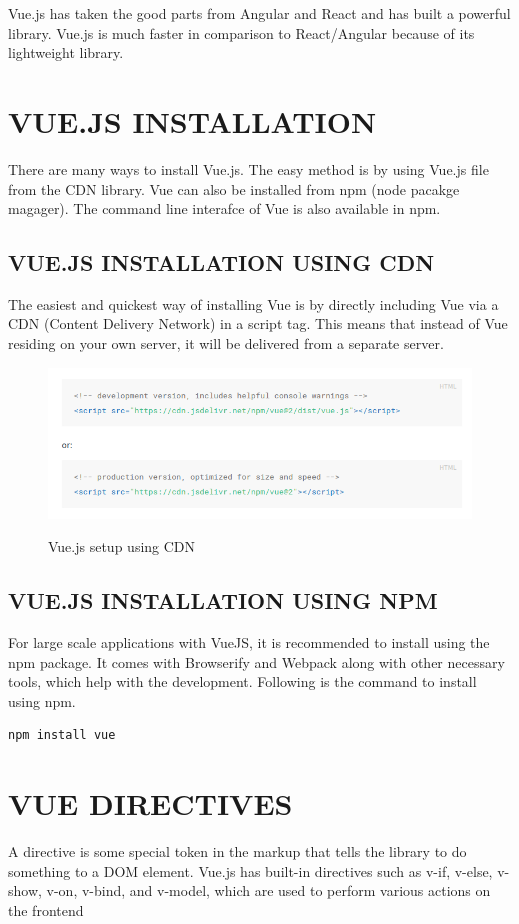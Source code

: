 \documentclass[12pt,a4paper,oneside]{report}
\begin{document}
Vue.js has taken the good parts from Angular and React and has built a powerful library. Vue.js is much faster in comparison to React/Angular because of its lightweight library.

\chapter{VUE.JS INSTALLATION }
There are many ways to install Vue.js. The easy method is by using Vue.js file from the CDN library. Vue can also be  installed  from npm (node pacakge magager). The command line interafce of Vue is also available in npm.
\section{VUE.JS INSTALLATION USING CDN}
The easiest and quickest way of installing Vue is by directly including Vue via a CDN (Content Delivery Network) in a script tag. This means that instead of Vue residing on your own server, it will be delivered from a separate server.
\begin{figure}[H]
    \begin{center}
        \label{abc}
            \includegraphics[scale=.6]{vueSetup.png}
            \caption{ Vue.js setup using CDN \cite{vue-code}}
    \end{center}
\end{figure}

\section{VUE.JS INSTALLATION USING NPM}
For large scale applications with VueJS, it is recommended to install using the npm package. It comes with Browserify and Webpack along with other necessary tools, which help with the development. Following is the command to install using npm.
\begin{lstlisting}
npm install vue

\end{lstlisting}
\chapter{VUE DIRECTIVES}
A directive is some special token in the markup that tells the library to do something to a DOM element. Vue.js has built-in directives such as v-if, v-else, v-show, v-on, v-bind, and v-model, which are used to
perform various actions on the frontend
\end{document}
